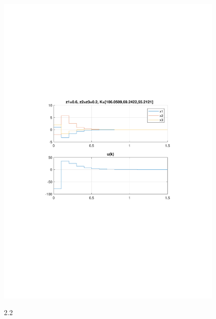 \documentclass{article}
\begin{document}
{\begin{figure}[H]
\includegraphics[clip, trim=0.5cm 9.5cm 0.5cm 9.5cm, width=1.00\textwidth]{../rys/zad3b_rys2.pdf}
\label{fig:rys3.2.2}
\caption{2.2}
\end{figure}
}
\end{document}
